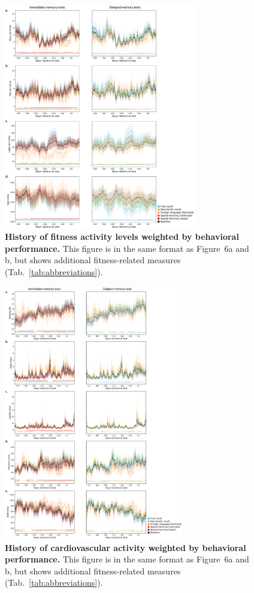 \documentclass[10pt]{article}
\newcommand{\dynamics}{6}
\begin{document}
\begin{figure}[p]
  \centering
  \includegraphics[width=0.75\textwidth]{figs/weighted_timecourse_activity}
\caption{\textbf{History of fitness activity levels weighted by
    behavioral performance.}  This figure is in the same format as
  Figure~\dynamics a and b, but shows additional fitness-related measures (Tab.~\ref{tab:abbreviations}).}
\label{fig:activity_timecourse}
\end{figure}

\begin{figure}[p]
  \centering
  \includegraphics[width=0.7\textwidth]{figs/weighted_timecourse_HR}
\caption{\textbf{History of cardiovascular activity weighted by
    behavioral performance.}  This figure is in the same format as
  Figure~\dynamics a and b, but shows additional fitness-related measures (Tab.~\ref{tab:abbreviations}).}
\label{fig:HR_timecourse}
  \end{figure}
\end{document}
